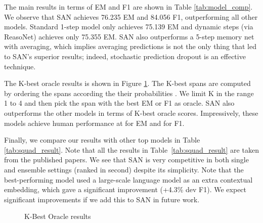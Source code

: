 \documentclass[11pt,a4paper]{article}
\begin{document}
The main results in terms of EM and F1 are shown in  Table \ref{tab:model_comp}. 
We observe that SAN achieves 76.235 EM and 84.056 F1, outperforming all other models. 
Standard 1-step model only achieves 75.139 EM and dynamic steps (via ReasoNet) achieves only 75.355 EM. SAN also outperforms a 5-step memory net with averaging, which implies averaging predictions is not the only thing that led to SAN's superior results; 
indeed, stochastic prediction dropout is an effective technique.

The K-best oracle results is shown in Figure \ref{fig:sys_vs_hum}. 
The K-best spans are computed by ordering the spans according the their probabilities .
We limit K in the range 1 to 4 and then pick the span with the best EM or F1 as oracle. 
SAN also outperforms the other models in terms of K-best oracle scores. Impressively, these models achieve human performance at  for EM and  for F1.

Finally, we compare our results with other top models in Table \ref{tab:squad_result}. Note that all the results in Table~\ref{tab:squad_result} are taken from the published papers. 
We see that SAN is very competitive in both single and ensemble settings (ranked in second) despite its simplicity. Note that the best-performing model \cite{2018arXiv180205365P} used a large-scale language model as an extra contextual embedding, which gave a significant improvement (+4.3\% dev F1). We expect significant improvements if we add this to SAN in future work.


\begin{figure}[t]
\centering  
{}
\caption{\label{fig:sys_vs_hum} K-Best Oracle results}
\end{figure}
\end{document}
